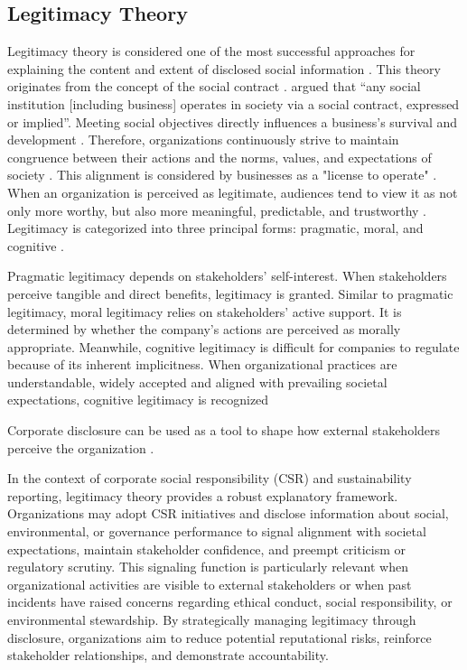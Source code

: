 \subsection{Legitimacy Theory}

Legitimacy theory is considered one of the most successful approaches for explaining the content 
and extent of disclosed social information \parencite{Grey1995}. This theory originates from the concept of the social 
contract \parencite{Patten1991}. \textcite{Schoker1974} argued that “any social institution [including business] 
operates in society via a social contract, expressed or implied”. Meeting social objectives directly influences 
a business's survival and development \parencite{Schoker1974}. Therefore, organizations continuously strive to 
maintain congruence between their actions and the norms, values, and expectations of society \parencite{Suchman1995}. 
This alignment is considered by businesses as a "license to operate" \parencite{Demuijnck2016}. When an organization 
is perceived as legitimate, audiences tend to view it as not only more worthy, but also more meaningful, predictable, 
and trustworthy \parencite{Suchman1995}. Legitimacy is categorized into three principal forms: pragmatic, moral, and cognitive
\parencite{Suchman1995}. 

Pragmatic legitimacy depends on stakeholders' self-interest. When stakeholders perceive tangible 
and direct benefits, legitimacy is granted. Similar to pragmatic legitimacy, moral legitimacy relies on stakeholders' 
active support. It is determined by 
whether the company's actions are perceived as morally appropriate. Meanwhile, cognitive legitimacy is difficult 
for companies to regulate because of its inherent implicitness. When organizational practices are understandable, 
widely accepted and aligned with prevailing societal expectations, cognitive legitimacy is recognized \parencite{Suchmann1995}

Corporate disclosure can be used as a tool to shape how external stakeholders perceive the organization \parencite[p.~11]{Deegan2002}.


In the context of corporate social responsibility (CSR) and sustainability reporting, legitimacy theory provides 
a robust explanatory framework. Organizations may adopt CSR initiatives and disclose information about social, 
environmental, or governance performance to signal alignment with societal expectations, maintain stakeholder 
confidence, and preempt criticism or regulatory scrutiny. This signaling function is particularly relevant 
when organizational activities are visible to external stakeholders or when past incidents have raised concerns 
regarding ethical conduct, social responsibility, or environmental stewardship. By strategically managing legitimacy 
through disclosure, organizations aim to reduce potential reputational risks, reinforce stakeholder relationships, 
and demonstrate accountability.

